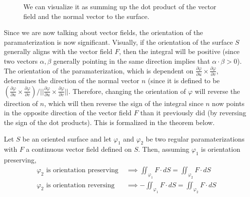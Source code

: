 \begin{definition}
\begin{figure}[H]
			\caption{We can visualize it as summing up the dot product of the vector field and the normal vector to the surface. } 
			\label{fig:vector_surface_integral}
		\end{figure}
  \end{definition}
		
  Since we are now talking about vector fields, the orientation of the paramaterization is now significant. Visually, if the orientation of the surface $S$ generally aligns with the vector field $F$, then the integral will be positive (since two vectors $\alpha, \beta$ generally pointing in the same direction implies that $\alpha \cdot \beta > 0$). The orientation of the paramaterization, which is dependent on $\frac{\partial \varphi}{\partial u} \times \frac{\partial \varphi}{\partial v}$, determines the direction of the normal vector $n$ (since it is defined to be $(\frac{\partial \varphi}{\partial u} \times \frac{\partial \varphi}{\partial v}) / \big|\big|\frac{\partial \varphi}{\partial u} \times \frac{\partial \varphi}{\partial v}\big|\big|$. Therefore, changing the orientation of $\varphi$ will reverse the direction of $n$, which will then reverse the sign of the integral since $n$ now points in the opposite direction of the vector field $F$ than it previously did (by reversing the sign of the dot products). This is formalized in the theorem below. 
		
  \begin{theorem}
		Let $S$ be an oriented surface and let $\varphi_1$ and $\varphi_2$ be two regular paramaterizations with $F$ a continuous vector field defined on $S$. Then, assuming $\varphi_1$ is orientation preserving, 
		\begin{align}
			\varphi_2 \text{ is orientation preserving } & \implies \iint_{\varphi_1} F \cdot d S = \iint_{\varphi_2} F \cdot d S \\
			\varphi_2 \text{ is orientation reversing } & \implies - \iint_{\varphi_1} F \cdot d S = \iint_{\varphi_2} F \cdot d S 
		\end{align}
  \end{theorem}
		
